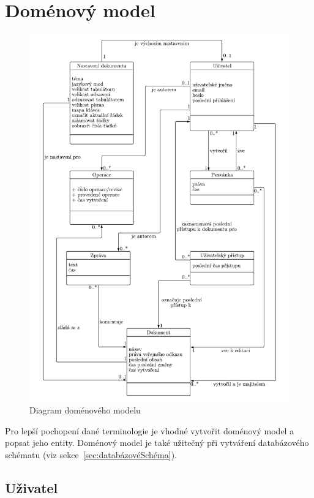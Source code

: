 \section{Doménový model}\label{sec:domenovyModel}

\begin{figure}[ht!]
    \centering
    \includegraphics[width=\textwidth]{partials/analyza/domenovy_model-2.pdf}
    \caption{Diagram doménového modelu}\label{fig:domenovy_model}
\end{figure}

Pro lepší pochopení dané terminologie je vhodné vytvořit doménový model a popsat jeho entity.
Doménový model je také užitečný při vytváření databázového schématu (viz sekce~\ref{sec:databázovéSchéma}).

\subsection{Uživatel}\label{subsec:uživatel}

